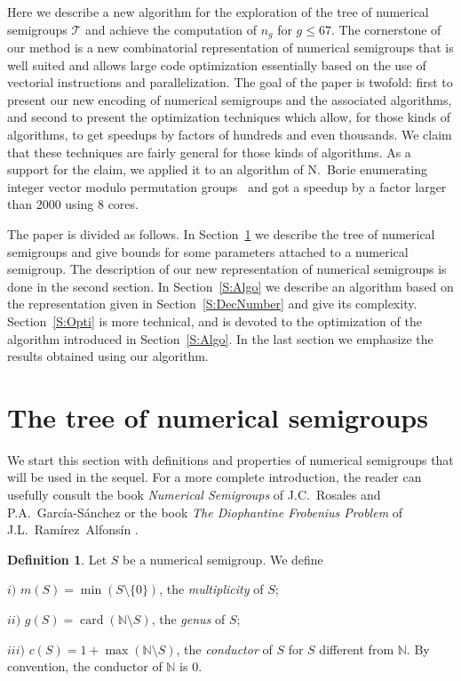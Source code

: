 \documentclass[reqno]{amsart}
\theoremstyle{plain}
\theoremstyle{definition}
\newtheorem{defi}[prop]{Definition}
\renewcommand{\leq}{\leqslant}
\newcommand{\NN}{\mathbb{N}}
\DeclareMathOperator{\card}{card}
\begin{document}
Here we describe a new algorithm for the exploration of the tree of numerical
semigroups $\mathcal{T}$ and achieve the computation of $n_g$ for $g\leq 67$.
The cornerstone of our method is a new combinatorial representation of
numerical semigroups that is well suited and allows large code optimization essentially based on the use of
vectorial instructions and parallelization.
The goal of the paper is twofold:
first to present our new encoding of numerical semigroups and the associated
algorithms, and second to present the optimization techniques which allow, for
those kinds of algorithms, to get speedups by factors of hundreds and even
thousands. We claim that these techniques are fairly general for those kinds of
algorithms. As a support for the claim, we applied it to an algorithm of
N.~Borie enumerating integer vector modulo permutation groups~\cite{Borie} and
got a speedup by a factor larger than 2000 using 8 cores.

The paper is divided as follows.
In Section~\ref{S:Tree} we describe the tree of numerical semigroups and give bounds for some parameters attached to a numerical semigroup.
The description of our new representation of numerical semigroups is done in the second section.
In Section~\ref{S:Algo} we describe an algorithm based on the representation given in Section~\ref{S:DecNumber} and give its complexity. 
Section~\ref{S:Opti} is more technical, and is devoted to the optimization of the algorithm introduced in Section~\ref{S:Algo}.
In the last section we emphasize the results obtained using our algorithm.


\section{The tree of numerical semigroups}
\label{S:Tree}

We start this section with definitions and properties of numerical semigroups that will be used in the sequel.
For a more complete introduction, the reader can usefully consult the book \emph{Numerical Semigroups} of J.C.~Rosales and P.A.~Garc\'ia-S\'anchez \cite{BookNS} or the book \emph{The Diophantine Frobenius Problem} of J.L.~Ram\'irez~Alfons\'in \cite{BookDFP}.

\begin{defi}
Let $S$ be a numerical semigroup. We define 

$i)$ $m(S)=\min(S\setminus\{0\})$, the \emph{multiplicity} of $S$;

$ii)$ $g(S)=\card(\NN\setminus S)$, the \emph{genus} of $S$;

$iii)$ $c(S)=1+\max(\NN\setminus S)$, the \emph{conductor} of $S$ for $S$ different from $\NN$. By convention, the conductor of $\NN$ is $0$. 
\end{defi}
\end{document}
